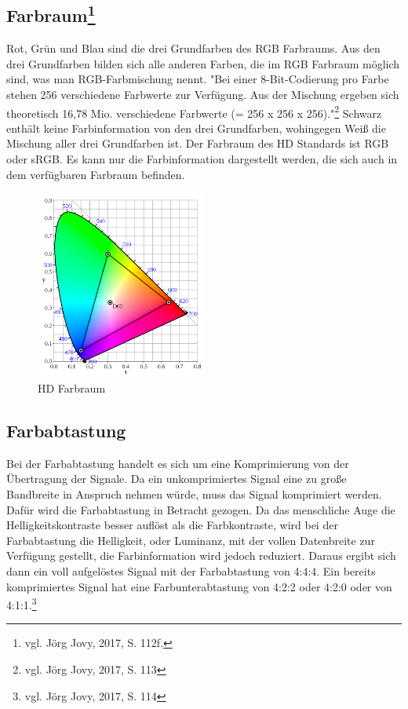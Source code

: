 \subsection[Farbraum]{Farbraum\protect\footnote{\label{}vgl. Jörg Jovy, 2017, S. 112f.}}
Rot, Grün und Blau sind die drei Grundfarben des RGB Farbraums. Aus den drei Grundfarben bilden sich alle anderen Farben, die im RGB Farbraum möglich sind, was man RGB-Farbmischung nennt. "Bei einer 8-Bit-Codierung pro Farbe stehen 256 verschiedene Farbwerte zur Verfügung. Aus der Mischung ergeben sich theoretisch 16,78 Mio. verschiedene Farbwerte (= 256 x 256 x 256)."\footnote{\label{}vgl. Jörg Jovy, 2017, S. 113} Schwarz enthält keine Farbinformation von den drei Grundfarben, wohingegen Weiß die Mischung aller drei Grundfarben ist. Der Farbraum des HD Standards ist RGB oder sRGB. Es kann nur die Farbinformation dargestellt werden, die sich auch in dem verfügbaren Farbraum befinden. 
\begin{figure}[H]
	\centering
	\includegraphics[width=0.5\textwidth]{abb11} 
	\caption{HD Farbraum}
\end{figure}
\subsection{Farbabtastung}
Bei der Farbabtastung handelt es sich um eine Komprimierung von  der Übertragung der Signale. Da ein unkomprimiertes Signal eine zu große Bandbreite in Anspruch nehmen würde, muss das Signal komprimiert werden. Dafür wird die Farbabtastung in Betracht gezogen. Da das menschliche Auge die Helligkeitskontraste besser auflöst als die Farbkontraste, wird bei der Farbabtastung die Helligkeit, oder Luminanz, mit der vollen Datenbreite zur Verfügung gestellt, die Farbinformation wird jedoch reduziert. Daraus ergibt sich dann ein voll aufgelöstes Signal mit der Farbabtastung von 4:4:4. Ein bereits komprimiertes Signal hat eine Farbunterabtastung von 4:2:2 oder 4:2:0 oder von 4:1:1.\footnote{\label{}vgl. Jörg Jovy, 2017, S. 114}
